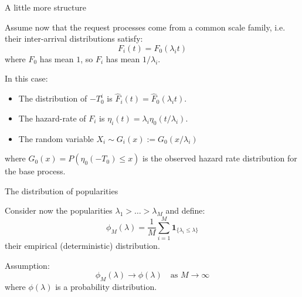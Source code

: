 \documentclass[aspectratio=169]{beamer}
\newcommand{\ind}[1]{\mathbf{1}_{#1}}
\newenvironment*{myitem}[1][1.5em]{\begin{itemize}\setlength{\itemsep}{#1}}{\end{itemize}}
\begin{document}
\begin{frame}{A little more structure}
	
	Assume now that the request processes come from a common scale family, i.e. their inter-arrival distributions satisfy:
	\begin{equation*}
		F_i(t) = F_0(\lambda_i t)
	\end{equation*}
	where $F_0$ has mean $1$, so $F_i$ has mean $1/\lambda_i$.

	\pause \vfill

	In this case:
	\begin{myitem}[1em]
		\item The distribution of $-T_0^i$ is $\hat{F}_i(t) = \hat{F}_0(\lambda_i t)$.
		\item The hazard-rate of $F_i$ is $\eta_i(t) = \lambda_i \eta_0(t/\lambda_i)$.
		\item The random variable $X_i\sim G_i(x):=G_0(x/\lambda_i)$
	\end{myitem}
	\vfill
	where $G_0(x) = P(\eta_0(-T_0)\leqslant x)$ is the observed hazard rate distribution for the base process.

\end{frame}

\begin{frame}{The distribution of popularities}
	
	Consider now the popularities $\lambda_1> \ldots > \lambda_M$ and define:
	\begin{equation*}
		\phi_M(\lambda) = \frac{1}{M}\sum_{i=1}^M \ind{\{\lambda_i\leqslant \lambda\}}
	\end{equation*}
	their empirical (deterministic) distribution.

	\pause \vfill
	\alert{Assumption:}
	\begin{equation*}
		\phi_M(\lambda) \to \phi(\lambda) \quad \text{as } M\to\infty
	\end{equation*}
	where $\phi(\lambda)$ is a probability distribution.
\end{frame}
\end{document}
